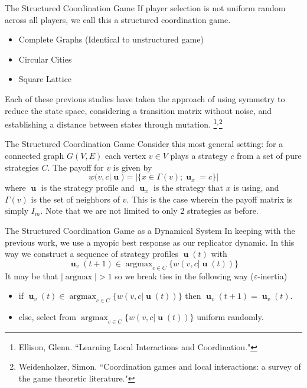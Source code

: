 \documentclass{beamer}
\DeclareMathOperator*{\argmax}{\text{argmax}}
\DeclareMathOperator{\uu}{\mathbf{u}}
\begin{document}
\begin{frame}{The Structured Coordination Game}
	If player selection is not uniform random across all players, we call this a structured coordination game. 
	\begin{itemize}
		\item Complete Graphs (Identical to unstructured game)
		\item Circular Cities
		\item Square Lattice 
	\end{itemize}
	Each of these previous studies have taken the approach of using symmetry to reduce the state space, considering a transition matrix without noise, and establishing a distance between states through mutation. \footnote{Ellison, Glenn. ``Learning Local Interactions and Coordination."}$^,$\footnote{Weidenholzer, Simon. ``Coordination games and local interactions: a survey of the game theoretic literature."}
\end{frame}

\begin{frame}{The Structured Coordination Game}
	Consider this most general setting: for a connected graph $G(V,E)$ each vertex $v\in V$ plays a strategy $c$ from a set of pure strategies $C$.  The payoff for $v$ is given by \begin{equation}
		w(v,c|\uu)=|\{x\in \Gamma (v);\uu_x=c\}|
	\end{equation}
	where $\uu$ is the strategy profile and $\uu_x$ is the strategy that $x$ is using, and $\Gamma(v)$ is the set of neighbors of $v$. 
	This is the case wherein the payoff matrix is simply $I_m$. Note that we are not limited to only 2 strategies as before. 
\end{frame}

\begin{frame}{The Structured Coordination Game as a Dynamical System}
	In keeping with the previous work, we use a myopic best response as our replicator dynamic. In this way we construct a sequence of strategy profiles $\uu(t)$ with 
	\begin{equation}
		\uu_v(t+1)\in \argmax_{c\in C}\{w(v,c|\uu(t))\}
	\end{equation}
It may be that $|\argmax|>1$ so we break ties in the following way ($\varepsilon$-inertia) 
\begin{itemize}
	\item if $\uu_v(t)\in \argmax_{c\in C}\{w(v,c|\uu(t))\}$ then $ \uu_v(t+1)=\uu_v(t)$.
	\item else, select from $\argmax_{c\in C}\{w(v,c|\uu(t))\}$ uniform randomly. 
	\end{itemize}
\end{frame}
\end{document}
